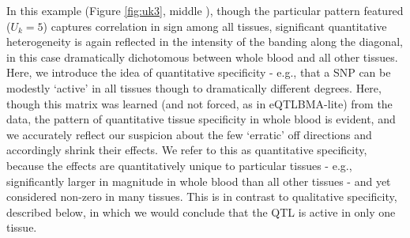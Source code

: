 %


In this example (Figure \ref{fig:uk3}, middle ), though the particular pattern featured ($U_{k}=5$) captures correlation in sign among all tissues, significant quantitative heterogeneity is again reflected in the intensity of the banding along the diagonal, in this case dramatically dichotomous between whole blood and all other tissues. Here, we introduce the idea of quantitative specificity - e.g., that a SNP can be modestly `active' in all tissues though to dramatically different degrees. Here, though this matrix was learned (and not forced, as in eQTLBMA-lite) from the data, the pattern of quantitative tissue specificity in %
whole blood is evident, and we accurately reflect our suspicion about the few `erratic' off directions and accordingly shrink their effects. %
We refer to this as quantitative specificity, because the effects are quantitatively unique to particular tissues - e.g., significantly larger in magnitude in whole blood than all other tissues - and yet considered non-zero in many tissues. This is in contrast to qualitative specificity, described below, in which we would conclude that the QTL is active in only one tissue. \newline





